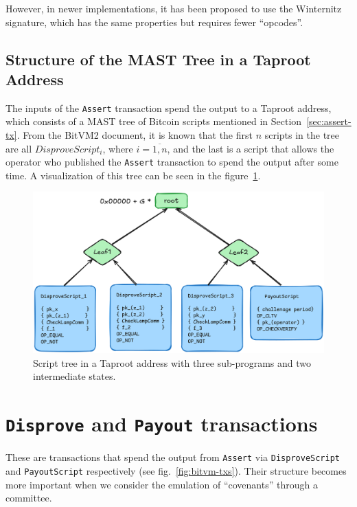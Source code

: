 \documentclass[11pt]{article}
\begin{document}
However, in newer implementations, it has been proposed to use the
Winternitz signature, which has the same properties but requires fewer
``opcodes''.

\subsection{Structure of the MAST Tree in a Taproot
Address}\label{sec:mast-tree-structure}

The inputs of the \texttt{Assert} transaction spend the output to a
Taproot address, which consists of a MAST tree of Bitcoin scripts
mentioned in Section~\ref{sec:assert-tx}. From the BitVM2 document, it
is known that the first \(n\) scripts in the tree are all
\(DisproveScript_i\), where \(i = \overline{1, n}\), and the last is a
script that allows the operator who published the \texttt{Assert}
transaction to spend the output after some time. A visualization of
this tree can be seen in the figure~\ref{fig:assert-tx-mast-tree}.

\begin{figure}[htbp]
  \centering
  \includegraphics[width=.9\linewidth]{../images/assert-tx-taproot-output.png}
  \caption{\label{fig:assert-tx-mast-tree}Script tree in a Taproot
  address with three sub-programs and two intermediate states.}
\end{figure}

\section{\texttt{Disprove} and \texttt{Payout}
transactions}\label{sec:disprove-payout-txs}

These are transactions that spend the output from \texttt{Assert} via
\texttt{DisproveScript} and \texttt{PayoutScript} respectively (see
fig.~\ref{fig:bitvm-txs}). Their structure becomes more important when
we consider the emulation of ``covenants'' through a committee.
\end{document}
